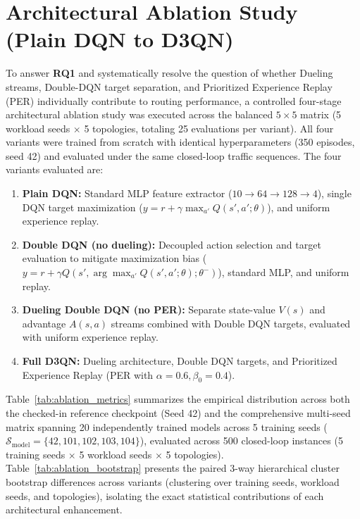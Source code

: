 \documentclass[12pt,a4paper,oneside]{report}
\begin{document}
\section{Architectural Ablation Study (Plain DQN to D3QN)}
\label{sec:res_ablation}
To answer \textbf{RQ1} and systematically resolve the question of whether Dueling streams, Double-DQN target separation, and Prioritized Experience Replay (PER) individually contribute to routing performance, a controlled four-stage architectural ablation study was executed across the balanced $5\times5$ matrix (5 workload seeds $\times$ 5 topologies, totaling 25 evaluations per variant). All four variants were trained from scratch with identical hyperparameters (350 episodes, seed 42) and evaluated under the same closed-loop traffic sequences. The four variants evaluated are:
\begin{enumerate}
  \item \textbf{Plain DQN:} Standard MLP feature extractor ($10 \rightarrow 64 \rightarrow 128 \rightarrow 4$), single DQN target maximization ($y = r + \gamma \max_{a'} Q(s', a'; \theta)$), and uniform experience replay.
  \item \textbf{Double DQN (no dueling):} Decoupled action selection and target evaluation to mitigate maximization bias ($y = r + \gamma Q(s', \arg\max_{a'} Q(s', a'; \theta); \theta^-)$), standard MLP, and uniform replay.
  \item \textbf{Dueling Double DQN (no PER):} Separate state-value $V(s)$ and advantage $A(s, a)$ streams combined with Double DQN targets, evaluated with uniform experience replay.
  \item \textbf{Full D3QN:} Dueling architecture, Double DQN targets, and Prioritized Experience Replay (PER with $\alpha=0.6, \beta_0=0.4$).
\end{enumerate}

Table~\ref{tab:ablation_metrics} summarizes the empirical distribution across both the checked-in reference checkpoint (Seed 42) and the comprehensive multi-seed matrix spanning 20 independently trained models across 5 training seeds ($\mathcal{S}_{\mathrm{model}} = \{42, 101, 102, 103, 104\}$), evaluated across 500 closed-loop instances (5 training seeds $\times$ 5 workload seeds $\times$ 5 topologies). Table~\ref{tab:ablation_bootstrap} presents the paired 3-way hierarchical cluster bootstrap differences across variants (clustering over training seeds, workload seeds, and topologies), isolating the exact statistical contributions of each architectural enhancement.
\end{document}

